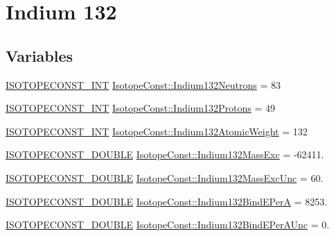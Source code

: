 \hypertarget{group___isotope_const-_indium-_in132}{}\section{Indium 132}
\label{group___isotope_const-_indium-_in132}
\subsection*{Variables}
\begin{DoxyCompactItemize}
\item 
\mbox{\hyperlink{group___isotope_const-_macros_ga5f18360b3e99483a35c32d789e62621c}{I\+S\+O\+T\+O\+P\+E\+C\+O\+N\+S\+T\+\_\+\+I\+NT}} \mbox{\hyperlink{group___isotope_const-_indium-_in132_gab0e6d66dd4fb6fb0714454a91f8fdb1f}{Isotope\+Const\+::\+Indium132\+Neutrons}} = 83
\item 
\mbox{\hyperlink{group___isotope_const-_macros_ga5f18360b3e99483a35c32d789e62621c}{I\+S\+O\+T\+O\+P\+E\+C\+O\+N\+S\+T\+\_\+\+I\+NT}} \mbox{\hyperlink{group___isotope_const-_indium-_in132_ga8c0aacb2d4a67232091dbfc19502e02d}{Isotope\+Const\+::\+Indium132\+Protons}} = 49
\item 
\mbox{\hyperlink{group___isotope_const-_macros_ga5f18360b3e99483a35c32d789e62621c}{I\+S\+O\+T\+O\+P\+E\+C\+O\+N\+S\+T\+\_\+\+I\+NT}} \mbox{\hyperlink{group___isotope_const-_indium-_in132_ga20b588483e841151db25c1fba4668f09}{Isotope\+Const\+::\+Indium132\+Atomic\+Weight}} = 132
\item 
\mbox{\hyperlink{group___isotope_const-_macros_ga8f45a7272ce02c0b4c65c44636ed719a}{I\+S\+O\+T\+O\+P\+E\+C\+O\+N\+S\+T\+\_\+\+D\+O\+U\+B\+LE}} \mbox{\hyperlink{group___isotope_const-_indium-_in132_gae1a23921e3550a0b0782879ea6fe4ea1}{Isotope\+Const\+::\+Indium132\+Mass\+Exc}} = -\/62411.
\item 
\mbox{\hyperlink{group___isotope_const-_macros_ga8f45a7272ce02c0b4c65c44636ed719a}{I\+S\+O\+T\+O\+P\+E\+C\+O\+N\+S\+T\+\_\+\+D\+O\+U\+B\+LE}} \mbox{\hyperlink{group___isotope_const-_indium-_in132_gaa685bce664bf12c800e9625cbbbbed6d}{Isotope\+Const\+::\+Indium132\+Mass\+Exc\+Unc}} = 60.
\item 
\mbox{\hyperlink{group___isotope_const-_macros_ga8f45a7272ce02c0b4c65c44636ed719a}{I\+S\+O\+T\+O\+P\+E\+C\+O\+N\+S\+T\+\_\+\+D\+O\+U\+B\+LE}} \mbox{\hyperlink{group___isotope_const-_indium-_in132_gaf137818ee51601c13b51f37e17a9eec8}{Isotope\+Const\+::\+Indium132\+Bind\+E\+PerA}} = 8253.
\item 
\mbox{\hyperlink{group___isotope_const-_macros_ga8f45a7272ce02c0b4c65c44636ed719a}{I\+S\+O\+T\+O\+P\+E\+C\+O\+N\+S\+T\+\_\+\+D\+O\+U\+B\+LE}} \mbox{\hyperlink{group___isotope_const-_indium-_in132_ga67096ec20ec0446ab7980383da7309bf}{Isotope\+Const\+::\+Indium132\+Bind\+E\+Per\+A\+Unc}} = 0.

\end{DoxyCompactItemize}
